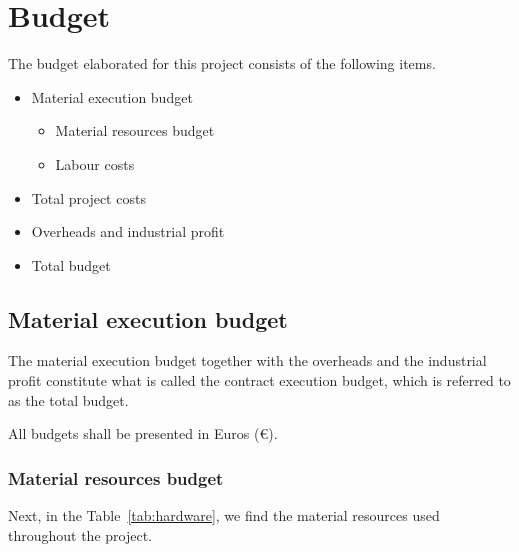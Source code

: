 \chapter{Budget}
\label{sec:budget}


The budget elaborated for this project consists of the following items.
\begin{itemize}
    \item Material execution budget
        \begin{itemize}
            \item Material resources budget
            \item Labour costs
        \end{itemize}
    \item Total project costs
    \item Overheads and industrial profit
    \item Total budget
\end{itemize}

\section*{Material execution budget}
The material execution budget together with the overheads and the industrial profit constitute what is called the contract execution budget, which is referred to as the total budget.

All budgets shall be presented in Euros (\euro).

\subsection*{Material resources budget}

Next, in the Table~\ref{tab:hardware}, we find the material resources used throughout the project.

